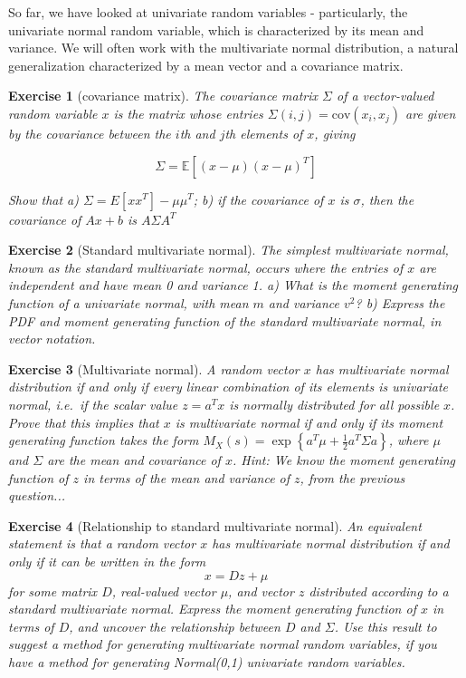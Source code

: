 \documentclass[twoside]{article}
\newcounter{lecnum}
\newtheorem{exercise}{Exercise}[lecnum]
\newcommand\E{\mathbb{E}}
\newcommand\cov{\mbox{cov}}
\begin{document}
So far, we have looked at univariate random variables - particularly, the univariate normal random variable, which is characterized by its mean and variance. We will often work with the multivariate normal distribution, a natural generalization characterized by a mean vector and a covariance matrix.

\begin{exercise}[covariance matrix]
  The covariance matrix $\Sigma$ of a vector-valued random variable $x$ is the matrix whose entries $\Sigma(i,j) = \cov(x_i,x_j)$ are given by the covariance between the $i$th and $j$th elements of $x$, giving

  $$\Sigma = \E\left[(x-\mu)(x-\mu)^T\right]$$

  Show that a) $\Sigma = E[xx^T] - \mu\mu^T$; b) if the covariance of $x$ is $\sigma$, then the covariance of $Ax+b$ is $A\Sigma A^T$
\end{exercise}

\begin{exercise}[Standard multivariate normal]
  The simplest multivariate normal, known as the standard multivariate normal, occurs where the entries of $x$ are independent and have mean 0 and variance 1. a) What is the moment generating function of a univariate normal, with mean $m$ and variance $v^2$? b) Express the PDF and moment generating function of the standard multivariate normal, in vector notation.
\end{exercise}


\begin{exercise}[Multivariate normal]
  A random vector $x$ has multivariate normal distribution if and only if every linear combination of its elements is univariate normal, i.e.\ if the scalar value $z = a^Tx$ is normally distributed for all possible $x$. Prove that this implies that $x$ is multivariate normal if and only if its moment generating function takes the form $M_X(s) = \exp\left\{a^T\mu + \frac{1}{2}a^T\Sigma a\right\}$, where $\mu$ and $\Sigma$ are the mean and covariance of $x$. \textit{Hint: We know the moment generating function of $z$ in terms of the mean and variance of $z$, from the previous question...}
\end{exercise}
  
\begin{exercise}[Relationship to standard multivariate normal]
  An equivalent statement is that a random vector $x$ has multivariate normal distribution if and only if it can be written in the form
  $$x = Dz + \mu$$
  for some matrix $D$, real-valued vector $\mu$, and vector $z$ distributed according to a standard multivariate normal. Express the moment generating function of $x$ in terms of $D$, and uncover the relationship between $D$ and $\Sigma$. Use this result to suggest a method for generating multivariate normal random variables, if you have a method for generating Normal(0,1) univariate random variables.
\end{exercise}
\end{document}
